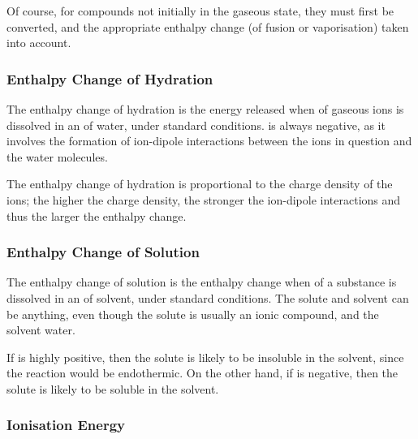 
				Of course, for compounds not initially in the gaseous state, they must first be converted, and the appropriate enthalpy
				change (of fusion or vaporisation) taken into account.




			\subsubsection{Enthalpy Change of Hydration}

				The enthalpy change of hydration is the energy released when  of gaseous ions is dissolved in an
				 of water, under standard conditions.  is always negative, as it involves the
				formation of ion-dipole interactions between the ions in question and the water molecules.


				The enthalpy change of hydration is proportional to the charge density of the ions; the higher the charge density,
				the stronger the ion-dipole interactions and thus the larger the enthalpy change.


			\subsubsection{Enthalpy Change of Solution}

				The enthalpy change of solution is the enthalpy change when  of a substance is dissolved in an 
				of solvent, under standard conditions. The solute and solvent can be anything, even though the solute is usually an ionic compound,
				and the solvent water.

				If  is highly positive, then the solute is likely to be insoluble in the solvent, since the reaction would be
				endothermic. On the other hand, if  is negative, then the solute is likely to be soluble in the solvent.


			\subsubsection{Ionisation Energy}

